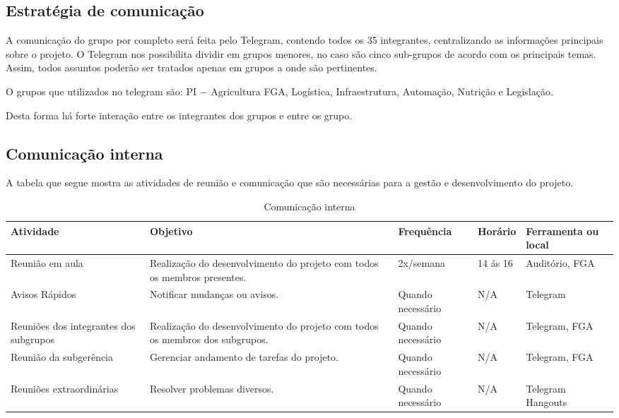 \subsection{Estratégia de comunicação}

  A comunicação do grupo por completo será feita pelo Telegram, contendo todos os 35 integrantes, centralizando as informações principais
  sobre o projeto. O Telegram nos possibilita dividir em grupos menores, no caso são cinco sub-grupos de acordo com os principais temas.
  Assim,  todos assuntos poderão ser tratados apenas em grupos a onde são pertinentes.

  O grupos que utilizados no telegram são: PI $-$ Agricultura FGA, Logística, Infraestrutura, Automação, Nutrição e Legislação.

  Desta forma há forte interação entre os integrantes dos grupos e entre os grupo.

\subsection{Comunicação interna}

  A tabela que segue mostra as atividades de reunião e comunicação que são necessárias para a gestão e desenvolvimento do projeto.

  \begin{table}[!htb]
    \centering
    \begin{tabular}{p{3cm}p{5cm}p{3cm}p{}p{3cm}}
      \toprule
        \textbf{Atividade} & \textbf{Objetivo} & \textbf{Frequência} & \textbf{Horário} & \textbf{Ferramenta ou local} \\
      \midrule
        Reunião em aula                         & Realização do desenvolvimento do projeto com todos os membros presentes.      & 2x/semana         & 14 ás 16  & Auditório, FGA    \\ \midrule
        Avisos Rápidos                          & Notificar mudanças ou avisos.                                                 & Quando necessário & N/A       & Telegram          \\ \midrule
        Reuniões dos integrantes dos subgrupos  & Realização do desenvolvimento do projeto com todos os membros dos subgrupos.  & Quando necessário & N/A       & Telegram, FGA     \\ \midrule
        Reunião da subgerência                  & Gerenciar andamento de tarefas do projeto.                                    & Quando necessário & N/A       & Telegram, FGA     \\ \midrule
        Reuniões extraordinárias                & Resolver problemas diversos.                                                  & Quando necessário & N/A       & Telegram Hangouts \\
      \bottomrule
    \end{tabular}
    \caption{Comunicação interna}
  \end{table}

